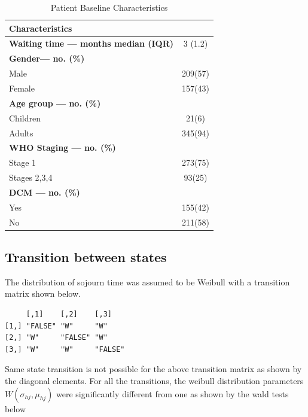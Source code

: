 \documentclass[11pt]{article}
\begin{document}
\begin{table}[H]
	\centering
	\caption{Patient Baseline Characteristics}
	\label{my_table}
	\begin{tabular}{|l|c|} %
		\hline
		Characteristics & \\
		 \hline 
		\textbf{Waiting time — months median (IQR)} & 3 (1.2) \\
		\hline
		\textbf{Gender— no. (\%)} &  \\ 
		Male & 209(57)\\
		Female & 157(43) \\ 
		\hline
		\textbf{Age group — no. (\%)} &  \\
		Children & 21(6) \\
		Adults & 345(94)\\
		\hline
		\textbf{WHO Staging — no. (\%)} &  \\
		Stage 1  &	273(75)\\
		Stages 2,3,4  &	93(25)\\
		\hline
		\textbf{DCM — no. (\%)}  & \\
		Yes & 155(42)\\
		No & 211(58)\\
		\hline
	\end{tabular}
\end{table}


\subsection{Transition between states}
The distribution of sojourn time was assumed to be Weibull with a transition matrix shown below.

\begin{verbatim}
     [,1]    [,2]    [,3]   
[1,] "FALSE" "W"     "W"    
[2,] "W"     "FALSE" "W"    
[3,] "W"     "W"     "FALSE"
\end{verbatim}

Same state transition is not possible for the above transition matrix as shown by the diagonal elements.
For all the transitions, the weibull distribution parameters $W(\sigma_{hj},\mu_{hj})$ were significantly different from one as shown by the wald tests below
\end{document}
